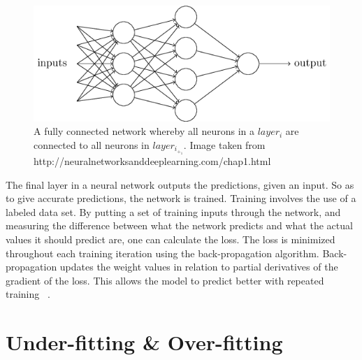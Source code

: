 \documentclass[12pt,a4paper,oneside,oldfontcommands]{memoir}
\begin{document}
\begin{Declaration Of OriginalityOrginality}
    \begin{figure}[ht]
    \center
      \includegraphics[width=\linewidth]{images/fully_connected.png}
      \caption{A fully connected network whereby all neurons in a \(layer_i\) are connected to all neurons in \(layer_i_+_1\). Image taken from http://neuralnetworksanddeeplearning.com/chap1.html}
      \label{fig:fully_connected}
    \end{figure}
    
The final layer in a neural network outputs the predictions, given an input. So as to give accurate predictions, the network is trained. Training involves the use of a labeled data set. By putting a set of training inputs through the network, and measuring the difference between what the network predicts and what the actual values it should predict are, one can calculate the loss. The loss is minimized throughout each training iteration using the back-propagation algorithm. Back-propagation updates the weight values in relation to partial derivatives of the gradient of the loss. This allows the model to predict better with repeated training ~\cite{rumelhart}. 

\section{Under-fitting \& Over-fitting}


\end{Declaration Of OriginalityOrginality}
\end{document}
